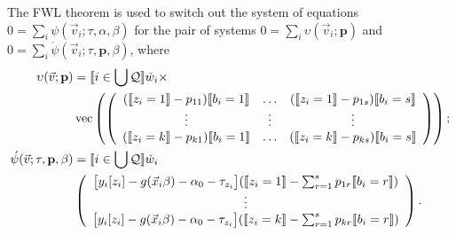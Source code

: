 \documentclass{article}
\DeclarePairedDelimiter{\indicator}{\llbracket}{\rrbracket}
\newcommand{\owt}[1][{[z_{i}]}]{\ensuremath{\check{w}_{i#1}}}
\newcommand{\absorbInterceptsEF}{\upsilon}
\begin{document}
The FWL theorem is used to switch out the system of equations
$0=\sum_{i}\psi(\vec{v}_{i}; \tau, \alpha, \beta)$
for the pair of systems $0 = \sum_{i}\absorbInterceptsEF(\vec{v}_{i}; \mathbf{p})$ and
$0= \sum_{i}\acute{\psi}(\vec{v}_{i}; \tau, \mathbf{p},
\beta)$,  where
\begin{align}
  \absorbInterceptsEF(\vec{v}; \mathbf{p}) &=
                                             \indicator{i \in \bigcup \mathcal{Q}} \owt[] \times \nonumber \\
  &\operatorname{vec}\left(%
    \left(
    \begin{array}{ccc}
      (\indicator{z_{i}=1}-p_{11})\indicator{b_{i}=1}
      &\ldots
      &
        (\indicator{z_{i}=1}-p_{1s})\indicator{b_{i}=s}
      \\
      \vdots & \vdots & \vdots \\
      (\indicator{z_{i}=k}-p_{k1})\indicator{b_{i}=1}
      &\ldots
      &
        (\indicator{z_{i}=k}-p_{ks})\indicator{b_{i}=s}\\                                      \end{array}
  \right)%
  \right) ;\nonumber \\
  \acute{\psi}(\vec{v}; \tau, \mathbf{p}, \beta) &=
\indicator{i \in \bigcup \mathcal{Q}}\owt[] \nonumber \\
&\left(
  \begin{array}{c}                                               
    \big[y_{i}[z_{i}]
    -
    g(\vec{x}_{i}\beta)-\alpha_{0}-\tau_{z_{i}}\big]
    (
    \indicator{z_{i}=1} - \sum_{r=1}^{s}p_{1r}\indicator{b_{i}=r})\\
    \vdots \\
    {}\big[y_{i}[z_{i}]
    - g(\vec{x}_{i}\beta) - \alpha_{0}-
    \tau_{z_{i}}\big]
    (\indicator{z_{i}=k}
    - \sum_{r=1}^{s}p_{kr}\indicator{b_{i}=r})\\                                             \end{array}
\right) . \label{eq:upsilondef}
\end{align}
\end{document}
